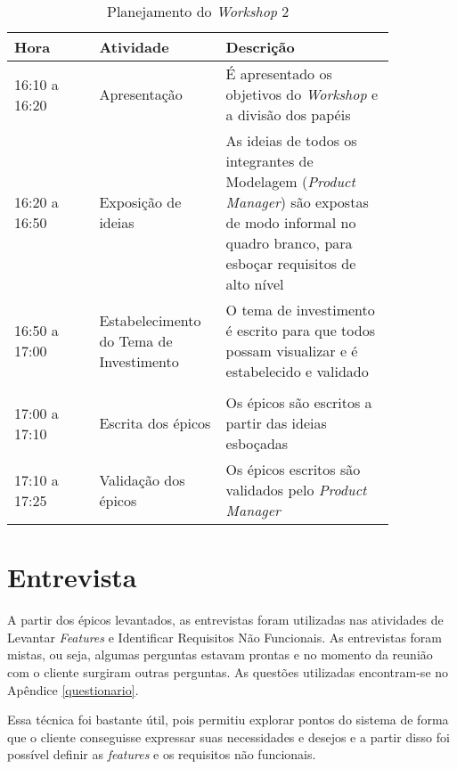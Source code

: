 \begin{table*}[!h]
\centering
\caption{Planejamento do \textit{Workshop} 2}
\label{fig:workshop2}
  \begin{tabular}{p{0.20\linewidth}p{0.25\linewidth}p{0.40\linewidth}}
  \hline
  Hora  & Atividade & Descrição\\
  \hline

16:10 a 16:20  & Apresentação & É apresentado os objetivos do \textit{Workshop} e a divisão dos papéis \\

16:20 a 16:50 & Exposição de ideias & As ideias de todos os integrantes de Modelagem (\textit{Product Manager}) são expostas de modo informal no quadro branco, para esboçar requisitos de alto nível \\

16:50 a 17:00 & Estabelecimento do Tema de Investimento & O tema de investimento é escrito para que todos possam visualizar e é estabelecido e validado\\ \\

17:00 a 17:10 & Escrita dos épicos & Os épicos são escritos a partir das ideias esboçadas \\

17:10 a 17:25 & Validação dos épicos & Os épicos escritos são validados pelo \textit{Product Manager}\\

  \hline
  \end{tabular}
\end{table*}

\section{Entrevista}

A partir dos épicos levantados, as entrevistas foram utilizadas nas atividades de Levantar \textit{Features} e Identificar Requisitos Não Funcionais.
As entrevistas foram mistas, ou seja, algumas perguntas estavam prontas e no momento da reunião com o cliente surgiram
outras perguntas. As questões utilizadas encontram-se no Apêndice \ref{questionario}.

Essa técnica foi bastante útil, pois permitiu explorar pontos do sistema de forma que o cliente conseguisse
expressar suas necessidades e desejos e a partir disso foi possível definir as \textit{features} e os requisitos não funcionais.


